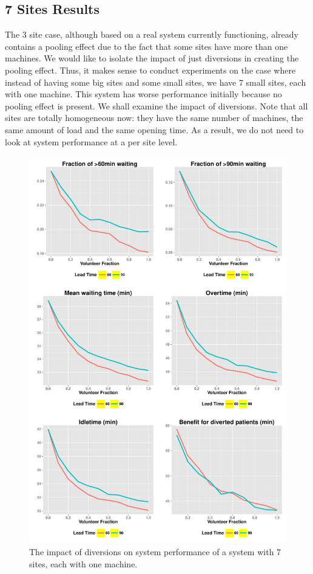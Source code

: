 \subsection{7 Sites Results}

The 3 site case, although based on a real system currently functioning,
already contains a pooling effect due to the fact that some sites have more than one
machines. We would like to isolate the impact of just diversions in creating
the pooling effect. Thus,
it makes sense to conduct experiments on the case where instead of
having some big sites and some small sites, we have 7 small sites, each
with one machine. This system has worse performance initially
because no pooling effect is present. We shall examine the
impact of diversions. Note that all sites are totally homogeneous now:
they have the same number of machines, the same amount of load and
the same opening time. As a result, we do not need to look at system
performance at a per site level.

\begin{figure}[htp]
\centering
\includegraphics[width=.96\textwidth]{chap3/numeric/pic/7sites_all}
\caption{The impact of diversions on system performance of a system
with 7 sites, each with one machine.}
\label{fig:7sites_all}
\end{figure}

